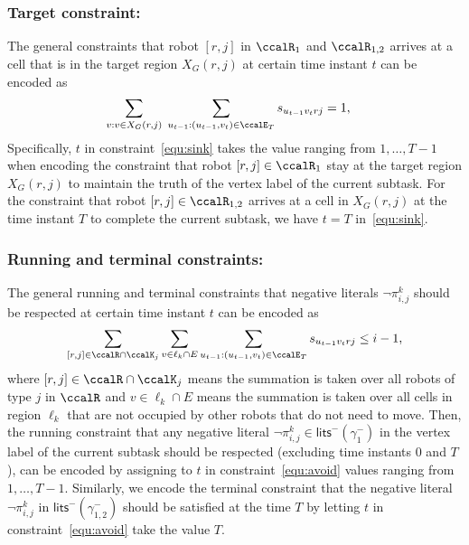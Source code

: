 \documentclass[Afour,sageh,times]{sagej}
\renewcommand{\ap}[3]{\mathcal{\pi}_{{#1},{#2}}^{#3}}
\begin{document}
{{\subsubsection{Target constraint:}
The general constraints that robot $[r,j]$ in $\ccalR_1$ and $\ccalR_{1,2}$  arrives at a cell that is in the target region $X_G(r,j)$ at certain time instant $t$ can be encoded as
\begingroup\makeatletter\def\f@size{10}\check@mathfonts
\def\maketag@@@#1{\hbox{\m@th\normalsize\normalfont#1}}%
\begingroup
  \begin{align}\label{equ:sink}
  \sum_{v: v \in X_G(r,j) } \;\sum_{u_{t-1}:(u_{t-1}, v_{t}) \in \ccalE_T} s_{u_{t-1} v_{t} rj} &  = 1,
  \end{align}
  \endgroup
 Specifically, $t$ in constraint~\eqref{equ:sink} takes the value ranging from $1, \ldots, T-1$ when encoding the constraint that robot $[r,j] \in\ccalR_1$  stay at the target region $X_G(r,j)$ to maintain the truth of  the vertex label of the current subtask.  For the constraint that robot $[r,j]\in\ccalR_{1,2} $ arrives at a cell in $X_G(r,j)$ at the time instant $T$ to complete the current subtask, we have $t = T$ in~\eqref{equ:sink}. %

 \subsubsection{Running and terminal constraints:} The general running and terminal constraints that negative literals $\neg \ap{i}{j}{k}$ should be respected at certain time instant $t$ can be encoded as
   \begingroup\makeatletter\def\f@size{10}\check@mathfonts
\def\maketag@@@#1{\hbox{\m@th\normalsize\normalfont#1}}%
\begin{align}\label{equ:avoid}
  \sum_{[r,j]\in \ccalR \cap \ccalK_j} \sum_{v \in \ell_k \cap E}   \sum_{u_{t-1}: (u_{t-1}, v_{t}) \in \ccalE_T} s_{u_{t-1} v_{t} r j } \leq i - 1,
\end{align}
\endgroup
where $[r,j] \in \ccalR \cap \ccalK_j$ means the summation is taken over all robots of type $j$ in $\ccalR$ and $v \in \ell_k \cap E$ means the summation is taken over all cells in region $\ell_k$ that are not occupied by other robots that do not need to move. Then, the running constraint that any
negative literal $\neg\ap{i}{j}{k} \in \mathsf{lits}^-(\gamma_1^-)$ in the vertex label of the current subtask should be respected (excluding time instants $0 $ and $T$), can be encoded by assigning to $t$ in constraint~\eqref{equ:avoid} values ranging from $1, \ldots, T-1$. Similarly, we encode the terminal constraint that the negative literal  $\neg\ap{i}{j}{k}$ in $\mathsf{lits}^-(\gamma_{1,2}^-)$  should be satisfied at the time $T$ by letting $t$ in constraint~\eqref{equ:avoid} take the value $T$.
}}
\end{document}
